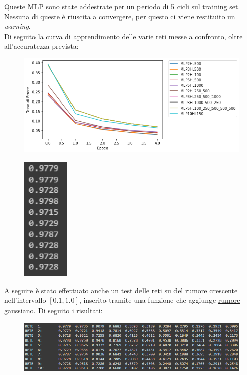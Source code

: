 \documentclass[12pt, a4paper]{article}
\begin{document}
Queste MLP sono state addestrate per un periodo di 5 cicli sul training set. Nessuna di queste è riuscita a convergere, per questo ci viene restituito un \textit{warning}. \\
Di seguito la curva di apprendimento delle varie reti messe a confronto, oltre all'accuratezza prevista:
\begin{figure}[H]
    \centering 
    \includegraphics[width=\textwidth]{ConfrontoClassica.png}
\end{figure}
\begin{figure}[H]
    \centering
    \includegraphics[width=0.2\textwidth]{AccuratezzaClassica.png}
\end{figure}

A seguire è stato effettuato anche un test delle reti su del rumore crescente nell'intervallo \([0.1 , 1.0]\), inserito tramite una funzione che aggiunge \href{https://it.wikipedia.org/wiki/Rumore_gaussiano}{rumore gaussiano}. Di seguito i risultati:
\begin{figure}[H]
    \centering
    \includegraphics[width=\textwidth]{RisultatiRumoreClassica.png}
\end{figure}
\end{document}
